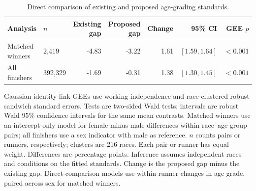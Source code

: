 \begin{table}[htbp]
\centering
\small
\caption{Direct comparison of existing and proposed age-grading standards.}
\label{tab:method-comparison}
\setlength{\tabcolsep}{4pt}
\begin{tabular}{llrrrrr}
\toprule
Analysis & $n$ & Existing gap & Proposed gap & Change & 95\% CI & GEE $p$ \\
\midrule
Matched winners & 2,419 & -4.83 & -3.22 & 1.61 & $[1.59, 1.64]$ & $<0.001$ \\
All finishers & 392,329 & -1.69 & -0.31 & 1.38 & $[1.30, 1.45]$ & $<0.001$ \\
\bottomrule
\end{tabular}
\par\medskip
\begin{minipage}{\textwidth}
\footnotesize
Gaussian identity-link GEEs use working independence and race-clustered robust sandwich standard errors. Tests are two-sided Wald tests; intervals are robust Wald 95\% confidence intervals for the same mean contrasts. Matched winners use an intercept-only model for female-minus-male differences within race--age-group pairs; all finishers use a sex indicator with male as reference. $n$ counts pairs or runners, respectively; clusters are 216 races. Each pair or runner has equal weight. Differences are percentage points. Inference assumes independent races and conditions on the fitted standards. Change is the proposed gap minus the existing gap. Direct-comparison models use within-runner changes in age grade, paired across sex for matched winners.
\end{minipage}
\end{table}
